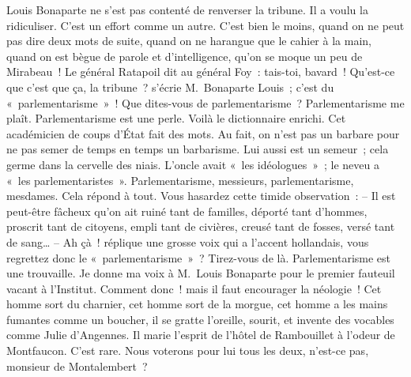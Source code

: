 \documentclass[french,twoside]{book} %
\begin{document}
Louis Bonaparte ne s’est pas contenté de renverser la tribune. Il a voulu la ridiculiser. C’est un effort comme un autre. C’est bien le moins, quand on ne peut pas dire deux mots de suite, quand on ne harangue que le cahier à la main, quand on est bègue de parole et d’intelligence, qu’on se moque un peu de Mirabeau ! Le général Ratapoil dit au général Foy : tais-toi, bavard ! Qu’est-ce que c’est que ça, la tribune ? s’écrie M. Bonaparte Louis ; c’est du « parlementarisme » ! Que dites-vous de parlementarisme ? Parlementarisme me plaît. Parlementarisme est une perle. Voilà le dictionnaire enrichi. Cet académicien de coups d’État fait des mots. Au fait, on n’est pas un barbare pour ne pas semer de temps en temps un barbarisme. Lui aussi est un semeur ; cela germe dans la cervelle des niais. L’oncle avait « les idéologues » ; le neveu a « les parlementaristes ». Parlementarisme, messieurs, parlementarisme, mesdames. Cela répond à tout. Vous hasardez cette timide observation : – Il est peut-être fâcheux qu’on ait ruiné tant de familles, déporté tant d’hommes, proscrit tant de citoyens, empli tant de civières, creusé tant de fosses, versé tant de sang… – Ah çà ! réplique une grosse voix qui a l’accent hollandais, vous regrettez donc le « parlementarisme » ? Tirez-vous de là. Parlementarisme est une trouvaille. Je donne ma voix à M. Louis Bonaparte pour le premier fauteuil vacant à l’Institut. Comment donc ! mais il faut encourager la néologie ! Cet homme sort du charnier, cet homme sort de la morgue, cet homme a les mains fumantes comme un boucher, il se gratte l’oreille, sourit, et invente des vocables comme Julie d’Angennes. Il marie l’esprit de l’hôtel de Rambouillet à l’odeur de Montfaucon. C’est rare. Nous voterons pour lui tous les deux, n’est-ce pas, monsieur de Montalembert ?
\end{document}
